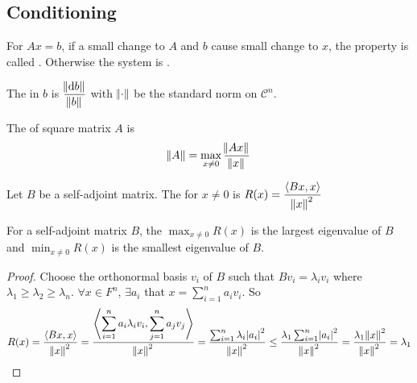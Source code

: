 \subsection{Conditioning}

\begin{definition}
    For $Ax=b$, if a small change to $A$ and $b$ cause small change to $x$, the property is called . Otherwise the system is .
\end{definition}

\begin{definition}
    The  in $b$ is $\dfrac{\norm{\dif{b}}}{\norm{b}}$ with $\norm{\cdot}$ be the standard norm on $\mathcal{C}^n$.
\end{definition}

\begin{definition}
    The  of square matrix $A$ is 
    \begin{equation}
        \norm{A} = \max_{x \neq 0} \frac{\norm{Ax}}{\norm{x}}
    \end{equation}
\end{definition}


\begin{definition}
    Let $B$ be a self-adjoint matrix. The  for $x \neq 0$ is $R(x) = \dfrac{\left\langle \displaystyle Bx, x \right\rangle}{\norm{x}^2}$
\end{definition}


\begin{theorem}
For a self-adjoint matrix $B$, the $\displaystyle \max_{x \neq 0} R(x)$ is the largest eigenvalue of $B$ and $\displaystyle \min_{x \neq 0} R(x)$ is the smallest eigenvalue of $B$.
\end{theorem}
\begin{proof}
    Choose the orthonormal basis $v_i$ of $B$ such that $Bv_i = \lambda_i v_i$ where $\lambda_1 \geq \lambda_2 \geq \lambda_n$. $\forall x \in F^n$, $\exists a_i$ that $\displaystyle x = \sum_{i=1}^n a_i v_i$. So
    \begin{equation*}
        R(x) = \frac{\left\langle \displaystyle Bx, x \right\rangle}{\norm{x}^2} = \frac{\left\langle \displaystyle \sum_{i=1}^n a_i \lambda_i v_i, \sum_{j=1}^n a_j v_j \right\rangle}{\norm{x}^2} = \frac{\sum_{i=1}^n \lambda_i \abs{a_i}^2}{\norm{x}^2} \leq \frac{\lambda_1 \sum_{i=1}^n \abs{a_i}^2}{\norm{x}^2} = \frac{\lambda_1 \norm{x}^2}{\norm{x}^2} = \lambda_1
    \end{equation*}
\end{proof}

